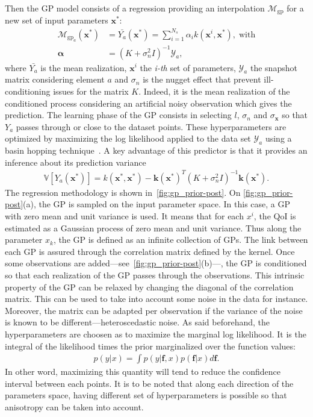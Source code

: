 Then the GP model consists of a regression providing an interpolation $\mathcal{M}_{\text{gp}}$ for a new set of input parameters $\mathbf{x^{*}}$:
\begin{align}
\mathcal{M}_{\text{gp}_{a}}(\mathbf{x}^*)&=\bar{Y_{a}}(\mathbf{x}^*) =  \sum_{i = 1}^{N_s}\alpha_i k (\mathbf{x}^i, \mathbf{x}^*), \;\text{with} \\
\mathbf{\alpha} &= (K + \sigma_n^2 I)^{-1}\mathcal{Y}_a, \nonumber
\end{align}
where $\bar{Y_a}$ is the mean realization, $\mathbf{x}^i$ the \textit{i-th} set of parameters, $\mathcal{Y}_{a}$ the snapshot matrix considering element $a$ and $\sigma_n$ is the nugget effect that prevent ill-conditioning issues for the matrix $K$. Indeed, it is the mean realization of the conditioned process considering an artificial noisy observation which gives the prediction. The learning phase of the GP consists in selecting $l$, $\sigma_n$ and $\sigma_\mathbf{x}$ so that $Y_a$ passes through or close to the dataset points. These hyperparameters are optimized by maximizing the log likelihood applied to the data set $\mathcal{Y}_a$ using a basin hopping technique~\citep{wales1997}. A key advantage of this predictor is that it provides an inference about its prediction variance
\begin{align}
\mathbb{V}[Y_{a}(\mathbf{x}^*)] = k(\mathbf{x}^*, \mathbf{x}^*)-\mathbf{k}(\mathbf{x}^*)^T(K + \sigma_n^2 I)^{-1}\mathbf{k}(\mathbf{x}^*).
\end{align}
The regression methodology is shown in~\cref{fig:gp_prior-post}. On \cref{fig:gp_prior-post}(a), the GP is sampled on the input parameter space. In this case, a GP with zero mean and unit variance is used. It means that for each $x^i$, the QoI is estimated as a Gaussian process of zero mean and unit variance. Thus along the parameter $x_{k}$, the GP is defined as an infinite collection of GPs. The link between each GP is assured through the correlation matrix defined by the kernel. Once some observations are added---see~\cref{fig:gp_prior-post}(b)---, the GP is conditioned so that each realization of the GP passes through the observations. This intrinsic property of the GP can be relaxed by changing the diagonal of the correlation matrix. This can be used to take into account some noise in the data for instance. Moreover, the matrix can be adapted per observation if the variance of the noise is known to be different---heteroscedastic noise. As said beforehand, the hyperparameters are choosen as to maximize the marginal log likelihood. It is the integral of the likelihood times the prior marginalized over the function values:
\begin{align}
p(y|x) = \int p(y|\mathbf{f}, x)p(\mathbf{f}|x)d\mathbf{f}.
\end{align}
\noindent In other word, maximizing this quantity will tend to reduce the confidence interval between each points. It is to be noted that along each direction of the parameters space, having different set of hyperparameters  is possible so that anisotropy can be taken into account.

